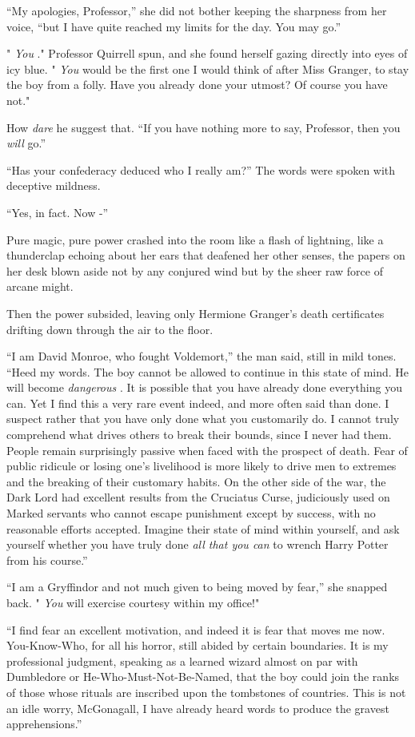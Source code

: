 ``My apologies, Professor,'' she did not bother keeping the sharpness
from her voice, ``but I have quite reached my limits for the day. You
may go.''

" \emph{You} ." Professor Quirrell spun, and she found herself gazing
directly into eyes of icy blue. " \emph{You} would be the first one I
would think of after Miss Granger, to stay the boy from a folly. Have
you already done your utmost? Of course you have not."

How \emph{dare} he suggest that. ``If you have nothing more to say,
Professor, then you \emph{will} go.''

``Has your confederacy deduced who I really am?'' The words were spoken
with deceptive mildness.

``Yes, in fact. Now -''

Pure magic, pure power crashed into the room like a flash of lightning,
like a thunderclap echoing about her ears that deafened her other
senses, the papers on her desk blown aside not by any conjured wind but
by the sheer raw force of arcane might.

Then the power subsided, leaving only Hermione Granger's death
certificates drifting down through the air to the floor.

``I am David Monroe, who fought Voldemort,'' the man said, still in mild
tones. ``Heed my words. The boy cannot be allowed to continue in this
state of mind. He will become \emph{dangerous} . It is possible that you
have already done everything you can. Yet I find this a very rare event
indeed, and more often said than done. I suspect rather that you have
only done what you customarily do. I cannot truly comprehend what drives
others to break their bounds, since I never had them. People remain
surprisingly passive when faced with the prospect of death. Fear of
public ridicule or losing one's livelihood is more likely to drive men
to extremes and the breaking of their customary habits. On the other
side of the war, the Dark Lord had excellent results from the Cruciatus
Curse, judiciously used on Marked servants who cannot escape punishment
except by success, with no reasonable efforts accepted. Imagine their
state of mind within yourself, and ask yourself whether you have truly
done \emph{all that you can} to wrench Harry Potter from his course.''

``I am a Gryffindor and not much given to being moved by fear,'' she
snapped back. " \emph{You} will exercise courtesy within my office!"

``I find fear an excellent motivation, and indeed it is fear that moves
me now. You-Know-Who, for all his horror, still abided by certain
boundaries. It is my professional judgment, speaking as a learned wizard
almost on par with Dumbledore or He-Who-Must-Not-Be-Named, that the boy
could join the ranks of those whose rituals are inscribed upon the
tombstones of countries. This is not an idle worry, McGonagall, I have
already heard words to produce the gravest apprehensions.''

